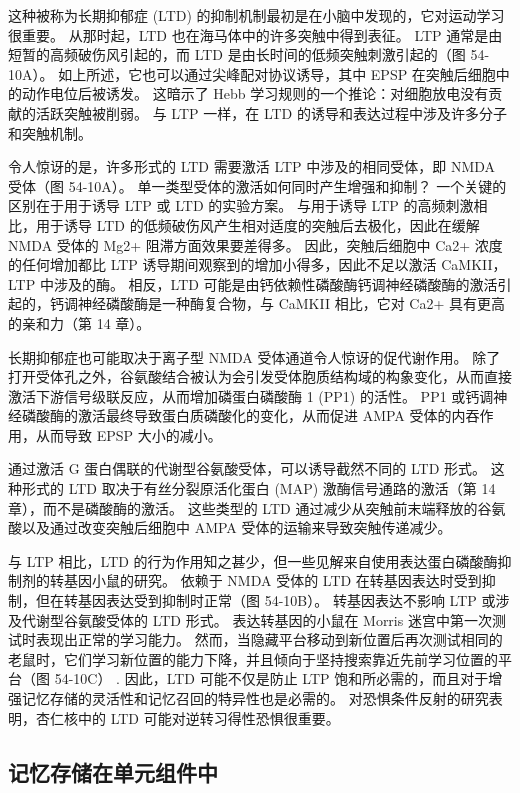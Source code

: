 这种被称为长期抑郁症 (LTD) 的抑制机制最初是在小脑中发现的，它对运动学习很重要。 从那时起，LTD 也在海马体中的许多突触中得到表征。 LTP 通常是由短暂的高频破伤风引起的，而 LTD 是由长时间的低频突触刺激引起的（图 54-10A）。 如上所述，它也可以通过尖峰配对协议诱导，其中 EPSP 在突触后细胞中的动作电位后被诱发。 这暗示了 Hebb 学习规则的一个推论：对细胞放电没有贡献的活跃突触被削弱。 与 LTP 一样，在 LTD 的诱导和表达过程中涉及许多分子和突触机制。

令人惊讶的是，许多形式的 LTD 需要激活 LTP 中涉及的相同受体，即 NMDA 受体（图 54-10A）。 单一类型受体的激活如何同时产生增强和抑制？ 一个关键的区别在于用于诱导 LTP 或 LTD 的实验方案。 与用于诱导 LTP 的高频刺激相比，用于诱导 LTD 的低频破伤风产生相对适度的突触后去极化，因此在缓解 NMDA 受体的 Mg2+ 阻滞方面效果要差得多。 因此，突触后细胞中 Ca2+ 浓度的任何增加都比 LTP 诱导期间观察到的增加小得多，因此不足以激活 CaMKII，LTP 中涉及的酶。 相反，LTD 可能是由钙依赖性磷酸酶钙调神经磷酸酶的激活引起的，钙调神经磷酸酶是一种酶复合物，与 CaMKII 相比，它对 Ca2+ 具有更高的亲和力（第 14 章）。

长期抑郁症也可能取决于离子型 NMDA 受体通道令人惊讶的促代谢作用。 除了打开受体孔之外，谷氨酸结合被认为会引发受体胞质结构域的构象变化，从而直接激活下游信号级联反应，从而增加磷蛋白磷酸酶 1 (PP1) 的活性。 PP1 或钙调神经磷酸酶的激活最终导致蛋白质磷酸化的变化，从而促进 AMPA 受体的内吞作用，从而导致 EPSP 大小的减小。

通过激活 G 蛋白偶联的代谢型谷氨酸受体，可以诱导截然不同的 LTD 形式。 这种形式的 LTD 取决于有丝分裂原活化蛋白 (MAP) 激酶信号通路的激活（第 14 章），而不是磷酸酶的激活。 这些类型的 LTD 通过减少从突触前末端释放的谷氨酸以及通过改变突触后细胞中 AMPA 受体的运输来导致突触传递减少。

与 LTP 相比，LTD 的行为作用知之甚少，但一些见解来自使用表达蛋白磷酸酶抑制剂的转基因小鼠的研究。 依赖于 NMDA 受体的 LTD 在转基因表达时受到抑制，但在转基因表达受到抑制时正常（图 54-10B）。 转基因表达不影响 LTP 或涉及代谢型谷氨酸受体的 LTD 形式。 表达转基因的小鼠在 Morris 迷宫中第一次测试时表现出正常的学习能力。 然而，当隐藏平台移动到新位置后再次测试相同的老鼠时，它们学习新位置的能力下降，并且倾向于坚持搜索靠近先前学习位置的平台（图 54-10C） . 因此，LTD 可能不仅是防止 LTP 饱和所必需的，而且对于增强记忆存储的灵活性和记忆召回的特异性也是必需的。 对恐惧条件反射的研究表明，杏仁核中的 LTD 可能对逆转习得性恐惧很重要。

\subsection{记忆存储在单元组件中}

